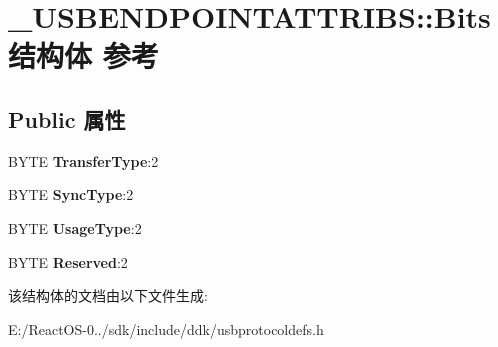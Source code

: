 \hypertarget{struct___u_s_b_e_n_d_p_o_i_n_t_a_t_t_r_i_b_s_1_1_bits}{}\section{\+\_\+\+U\+S\+B\+E\+N\+D\+P\+O\+I\+N\+T\+A\+T\+T\+R\+I\+BS\+:\+:Bits结构体 参考}
\label{struct___u_s_b_e_n_d_p_o_i_n_t_a_t_t_r_i_b_s_1_1_bits}
\subsection*{Public 属性}
\begin{DoxyCompactItemize}
\item 
\mbox{\label{struct___u_s_b_e_n_d_p_o_i_n_t_a_t_t_r_i_b_s_1_1_bits_a8d48a0649ea1931f694f0bebcb845d22}} 
B\+Y\+TE {\bfseries Transfer\+Type}\+:2
\item 
\mbox{\label{struct___u_s_b_e_n_d_p_o_i_n_t_a_t_t_r_i_b_s_1_1_bits_a5d4a456ae239db17b31b2b51e40ba972}} 
B\+Y\+TE {\bfseries Sync\+Type}\+:2
\item 
\mbox{\label{struct___u_s_b_e_n_d_p_o_i_n_t_a_t_t_r_i_b_s_1_1_bits_ab68462e0f7ce9d7e0a5778c48a2ea30d}} 
B\+Y\+TE {\bfseries Usage\+Type}\+:2
\item 
\mbox{\label{struct___u_s_b_e_n_d_p_o_i_n_t_a_t_t_r_i_b_s_1_1_bits_aff5a43953e71e0568ca18513769ad9a5}} 
B\+Y\+TE {\bfseries Reserved}\+:2
\end{DoxyCompactItemize}


该结构体的文档由以下文件生成\+:\begin{DoxyCompactItemize}
\item 
E\+:/\+React\+O\+S-\/0../sdk/include/ddk/usbprotocoldefs.\+h\end{DoxyCompactItemize}
